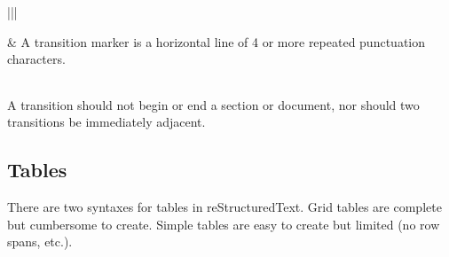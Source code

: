 \documentclass[letterpaper,10pt,english]{sphinxmanual}
\begin{document}
\begin{savenotes}
\begin{tabular}[t]{|*{2}{|}}
\begin{sphinxVerbatimintable}[commandchars=\\\{\}]

       
     
   
\end{sphinxVerbatimintable}
&
A transition marker is a horizontal line
of 4 or more repeated punctuation
characters.


\begin{savenotes}\sphinxattablestart
\centering
\begin{tabulary}{\linewidth}[t]{|T|}
\hline
\\
\hline
\end{tabulary}
\par
\sphinxattableend\end{savenotes}

A transition should not begin or end a
section or document, nor should two
transitions be immediately adjacent.
\\
\hline
\end{tabular}
\par
\sphinxattableend\end{savenotes}




\subsection{Tables}
\label{\detokenize{rst-cheatsheet/rst-cheatsheet:tables}}
There are two syntaxes for tables in reStructuredText. Grid tables are complete but cumbersome to create. Simple
tables are easy to create but limited (no row spans, etc.).
\end{document}
